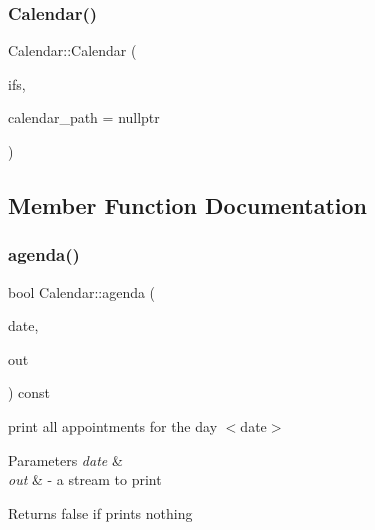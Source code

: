 \mbox{\label{classCalendar_a346673cf7dd15ffa3a2ea292703c5421}} 
\subsubsection{\texorpdfstring{Calendar()}{Calendar()}\hspace{0.1cm}{\footnotesize\ttfamily [3/3]}}
{\footnotesize\ttfamily Calendar\+::\+Calendar (\begin{DoxyParamCaption}\item[{std\+::ifstream \&}]{ifs,  }\item[{\hyperlink{classString}{String} const \&}]{calendar\+\_\+path = {\ttfamily nullptr} }\end{DoxyParamCaption})}



\subsection{Member Function Documentation}
\mbox{\label{classCalendar_ac6112aa4e9b3e6e5b9a478ff66789d77}} 
\subsubsection{\texorpdfstring{agenda()}{agenda()}}
{\footnotesize\ttfamily bool Calendar\+::agenda (\begin{DoxyParamCaption}\item[{\hyperlink{classDate}{Date} const \&}]{date,  }\item[{std\+::ostream \&}]{out }\end{DoxyParamCaption}) const}

print all appointments for the day $<$date$>$ 
\begin{DoxyParams}{Parameters}
{\em date} & \\
\hline
{\em out} & -\/ a stream to print \\
\hline
\end{DoxyParams}
\begin{DoxyReturn}{Returns}
false if prints nothing 
\end{DoxyReturn}
\mbox{\label{classCalendar_ac50220dec77b2c19f09516ea88e9398c}} 
